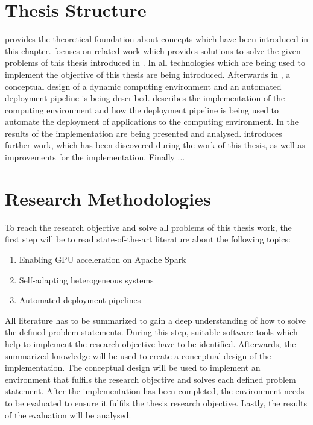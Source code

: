 \section{Thesis Structure}
 provides the theoretical foundation about concepts which have been introduced in this chapter.
 focuses on related work which provides solutions to solve the given problems of this thesis introduced in .
In  all technologies which are being used to implement the objective of this thesis are being introduced.
Afterwards in , a conceptual design of a dynamic computing environment and an automated deployment pipeline is being described.
 describes the implementation of the computing environment and how the deployment pipeline is being used to automate the deployment of applications to the computing environment.
In  the results of the implementation are being presented and analysed.
 introduces further work, which has been discovered during the work of this thesis, as well as improvements for the implementation.
Finally  ...


\section{Research Methodologies}
To reach the research objective and solve all problems of this thesis work, the first step will be to read state-of-the-art literature about the following topics:
\begin{enumerate}
\item Enabling GPU acceleration on Apache Spark
\item Self-adapting heterogeneous systems
\item Automated deployment pipelines
\end{enumerate}
All literature has to be summarized to gain a deep understanding of how to solve the defined problem statements.
During this step, suitable software tools which help to implement the research objective have to be identified.
Afterwards, the summarized knowledge will be used to create a conceptual design of the implementation.
The conceptual design will be used to implement an environment that fulfils the research objective and solves each defined problem statement.
After the implementation has been completed, the environment needs to be evaluated to ensure it fulfils the thesis research objective.
Lastly, the results of the evaluation will be analysed.
